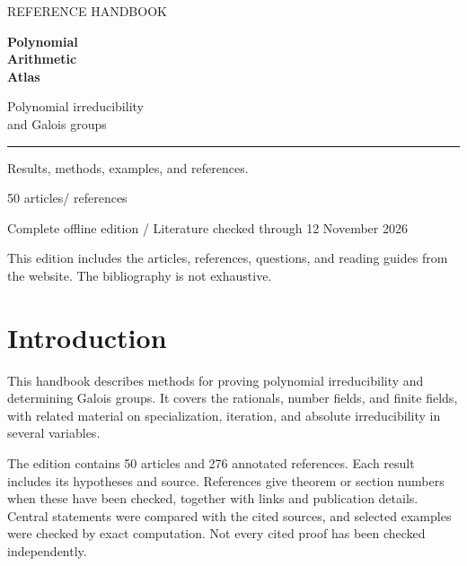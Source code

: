 \documentclass[11pt,a4paper,oneside,openany]{book}
\begin{document}
\begin{titlepage}\thispagestyle{empty}
\vspace*{14mm}
{\sffamily\large\color{atlasgold}REFERENCE HANDBOOK\par}
\vspace{14mm}
{\sffamily\bfseries\fontsize{38}{43}\selectfont\color{atlasgreen}Polynomial\\Arithmetic\\Atlas\par}
\vspace{11mm}
{\fontsize{18}{24}\selectfont Polynomial irreducibility\\and Galois groups\par}
\vspace{10mm}\textcolor{atlasgold}{\rule{35mm}{1.2pt}}\par\vspace{8mm}
{\large Results, methods, examples, and references.\par}
\vfill
{\sffamily\large 50 articles\quad / references\par}
\vspace{4mm}
{\color{atlasgray}Complete offline edition / Literature checked through 12 November 2026\par}
\vspace{7mm}
{\small This edition includes the articles, references, questions, and reading guides from the website. The bibliography is not exhaustive.\par}
\end{titlepage}
\frontmatter
\tableofcontents
\chapter{Introduction}
This handbook describes methods for proving polynomial irreducibility and determining Galois groups. It covers the rationals, number fields, and finite fields, with related material on specialization, iteration, and absolute irreducibility in several variables.

The edition contains 50 articles and 276 annotated references. Each result includes its hypotheses and source. References give theorem or section numbers when these have been checked, together with links and publication details. Central statements were compared with the cited sources, and selected examples were checked by exact computation. Not every cited proof has been checked independently.
\end{document}
